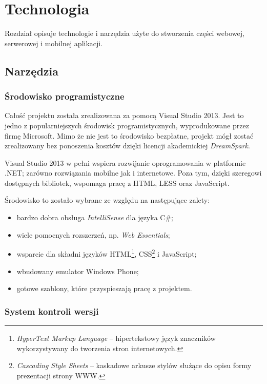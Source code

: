 \documentclass[a4paper]{book}
\begin{document}
	
	
	\chapter{Technologia}
	\label{id:cha:technologia}
	
	Rozdział opisuje technologie i narzędzia użyte do stworzenia części webowej, serwerowej i mobilnej aplikacji.
	
		\section{Narzędzia}		
			\subsection{Środowisko programistyczne}
				
			Całość projektu została zrealizowana za pomocą Visual Studio 2013. Jest to jedno z popularniejszych środowisk programistycznych, wyprodukowane przez firmę Microsoft. Mimo że nie jest to środowisko bezpłatne, projekt mógł zostać zrealizowany bez ponoszenia kosztów dzięki licencji akademickiej \textit{DreamSpark}. 
			
			Visual Studio 2013 w pełni wspiera rozwijanie oprogramowania w platformie .NET; zarówno rozwiązania mobilne jak i internetowe. Poza tym, dzięki szeregowi dostępnych bibliotek, wspomaga pracę z HTML, LESS oraz JavaScript.
			
			Środowisko to zostało wybrane ze względu na następujące zalety:
			\begin{itemize}
				\item bardzo  dobra obsługa \textit{IntelliSense} dla języka C\#;
				\item wiele pomocnych rozszerzeń, np. \textit{Web Essentials};
				\item wsparcie dla składni języków HTML\footnote{\emph{HyperText Markup Language} -- hipertekstowy język znaczników wykorzystywany do tworzenia stron internetowych.}, CSS\footnote{\emph{Cascading Style Sheets} -- kaskadowe arkusze stylów służące do opisu formy prezentacji strony WWW.} i JavaScript;
				\item wbudowany emulator Windows Phone;
				\item gotowe szablony, które przyspieszają pracę z projektem.
			\end{itemize}
			
			\subsection{System kontroli wersji}
			
\end{document}
